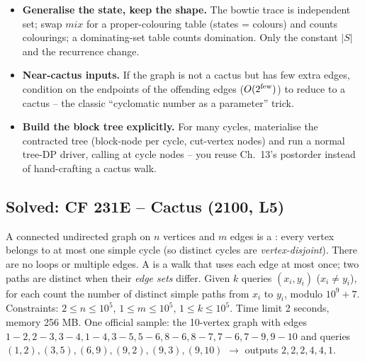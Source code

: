 \begin{hardeningbox}
\begin{itemize}[nosep,leftmargin=1.4em]
  \item \textbf{Generalise the state, keep the shape.} The bowtie trace is independent
        set; swap \(\mathit{mix}\) for a proper-colouring table (states = colours) and
         counts colourings; a dominating-set table counts domination.  Only
        the constant \(|S|\) and the  recurrence change.
  \item \textbf{Near-cactus inputs.} If the graph is not a cactus but has few extra
        edges, condition on the endpoints of the offending edges (\(O(2^{\text{few}})\))
        to reduce to a cactus -- the classic ``cyclomatic number as a parameter'' trick.
  \item \textbf{Build the block tree explicitly.} For many cycles, materialise the
        contracted tree (block-node per cycle, cut-vertex nodes) and run a normal
        tree-DP driver, calling  at cycle nodes -- you reuse Ch.~13's
        postorder instead of hand-crafting a cactus walk.
\end{itemize}
\end{hardeningbox}

\subsection{Solved: CF 231E -- Cactus (2100, L5)}


\begin{problemstatement}
A connected undirected graph on \(n\) vertices and \(m\) edges is a : every vertex belongs to at most one simple cycle (so distinct cycles are
\emph{vertex-disjoint}).  There are no loops or multiple edges.
A  is a walk that uses each edge at most once; two paths are
distinct when their \emph{edge sets} differ.  Given \(k\) queries \((x_i,y_i)\)
(\(x_i\neq y_i\)), for each count the number of distinct simple paths from \(x_i\)
to \(y_i\), modulo \(10^9+7\).  Constraints: \(2\le n\le 10^5\), \(1\le m\le 10^5\),
\(1\le k\le 10^5\).  Time limit 2 seconds, memory 256 MB.  One official sample:
the 10-vertex graph with edges
\(1\!-\!2,2\!-\!3,3\!-\!4,1\!-\!4,3\!-\!5,5\!-\!6,8\!-\!6,8\!-\!7,7\!-\!6,7\!-\!9,9\!-\!10\)
and queries \((1,2),(3,5),(6,9),(9,2),(9,3),(9,10)\) \(\to\) outputs
\(2,2,2,4,4,1\).
\end{problemstatement}

